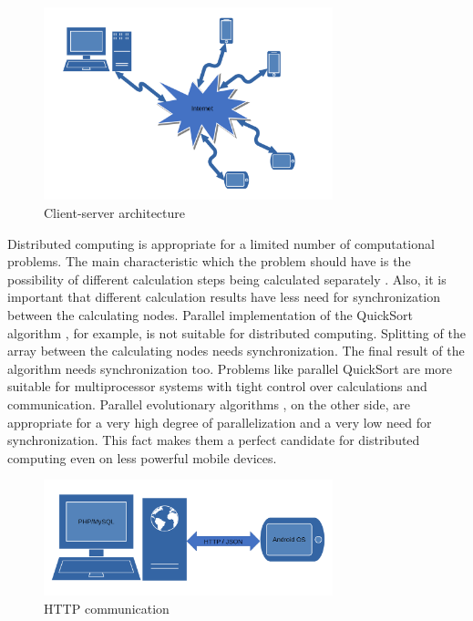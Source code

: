 \documentclass{ifacconf}
\begin{document}
\begin{figure}
\begin{center}
\includegraphics[width=8.4cm]{images/fig0001}
\caption{Client-server architecture} 
\label{fig0001}
\end{center}
\end{figure}

Distributed computing is appropriate for a limited number of computational problems. The main characteristic which the problem should have is the possibility of different calculation steps being calculated separately \cite{Hillis-1986-a}. Also, it is important that different calculation results have less need for synchronization between the calculating nodes. Parallel implementation of the QuickSort algorithm \cite{Sanders-1997-a}, for example, is not suitable for distributed computing. Splitting of the array between the calculating nodes needs synchronization. The final result of the algorithm needs synchronization too. Problems like parallel QuickSort are more suitable for multiprocessor systems with tight control over calculations and communication. Parallel evolutionary algorithms \cite{Sudholt-2015-a}, on the other side, are appropriate for a very high degree of parallelization and a very low need for synchronization. This fact makes them a perfect candidate for distributed computing even on less powerful mobile devices. 

\begin{figure}
\begin{center}
\includegraphics[width=8.4cm]{images/fig0002}
\caption{HTTP communication} 
\label{fig0002}
\end{center}
\end{figure}
\end{document}

